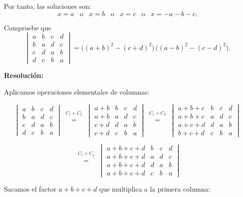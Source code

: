 \documentclass[a4paper,12pt]{article}
\begin{document}
\begin{ejercicio}[title=Ejercicio 35]
Por tanto, las soluciones son:
\[
\boxed{x=a \;\;\;\text{o}\;\;\; x=b \;\;\;\text{o}\;\;\; x=c \;\;\;\text{o}\;\;\; x=-a-b-c.}
\]

\end{ejercicio}

\begin{ejercicio}[title=Ejercicio 36]
Compruebe que
\[
\begin{vmatrix}
a & b & c & d\\
b & a & d & c\\
c & d & a & b\\
d & c & b & a
\end{vmatrix}
=
\big((a+b)^2 - (c+d)^2\big)\,\big((a-b)^2 - (c-d)^2\big).
\]

\tcblower
\textbf{Resolución:}

\vspace{0.5em}

Aplicamos operaciones elementales de columnas:

\[
\begin{vmatrix}
a & b & c & d\\
b & a & d & c\\
c & d & a & b\\
d & c & b & a
\end{vmatrix}
\overset{\substack{C_1+C_2\\{}}}{=}
\begin{vmatrix}
a+b & b & c & d\\
a+b & a & d & c\\
c+d & d & a & b\\
c+d & c & b & a
\end{vmatrix}
\overset{\substack{C_1+C_3\\{}}}{=}
\begin{vmatrix}
a+b+c & b & c & d\\
a+b+c & a & d & c\\
a+c+d & d & a & b\\
b+c+d & c & b & a
\end{vmatrix}
\]

\[
\overset{\substack{C_1+C_4\\{}}}{=}
\begin{vmatrix}
a+b+c+d & b & c & d\\
a+b+c+d & a & d & c\\
a+b+c+d & d & a & b\\
a+b+c+d & c & b & a
\end{vmatrix}
\]

Sacamos el factor $a+b+c+d$ que multiplica a la primera columna:


\end{ejercicio}
\end{document}
